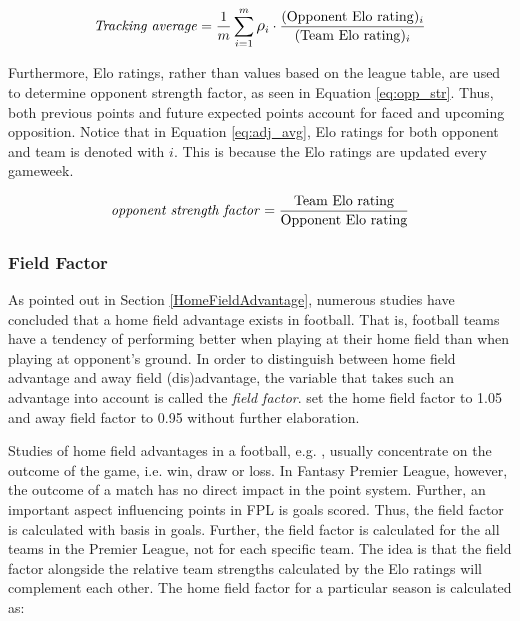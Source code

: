 \begin{equation}
\textrm{\textit{Tracking average}} = \frac{1}{m}\sum_{i=1}^m \rho_i \cdot \frac{(\mathrm{Opponent \ Elo \ rating})_i}{(\mathrm{Team \ Elo \ rating})_i}
\label{eq:adj_avg}
\end{equation}

Furthermore, Elo ratings, rather than values based on the league table, are used to determine opponent strength factor, as seen in Equation \ref{eq:opp_str}. Thus, both previous points and future expected points account for faced and upcoming opposition. Notice that in Equation \ref{eq:adj_avg}, Elo ratings for both opponent and team is denoted with $i$. This is because the Elo ratings are updated every gameweek.



\begin{equation}
\textrm{\textit{opponent strength factor}} = \frac{\textrm{Team Elo rating}}{\textrm{Opponent Elo rating}}
\label{eq:opp_str}
\end{equation}


\subsubsection{Field Factor}
As pointed out in Section \ref{HomeFieldAdvantage}, numerous studies have concluded that a home field advantage exists in football. That is, football teams have a tendency of performing better when playing at their home field than when playing at opponent's ground. In order to distinguish between home field advantage and away field (dis)advantage, the variable that takes such an advantage into account is called the \textit{field factor}. \cite{Bonomo} set the home field factor to 1.05 and away field factor to 0.95 without further elaboration. 

\newpar

Studies of home field advantages in a football, e.g. \cite{Pollard}, usually concentrate on the outcome of the game, i.e. win, draw or loss. In Fantasy Premier League, however, the outcome of a match has no direct impact in the point system. Further, an important aspect influencing points in FPL is goals scored. Thus, the field factor is calculated with basis in goals. Further, the field factor is calculated for the all teams in the Premier League, not for each specific team. The idea is that the field factor alongside the relative team strengths calculated by the Elo ratings will complement each other. The home field factor for a particular season is calculated as:

